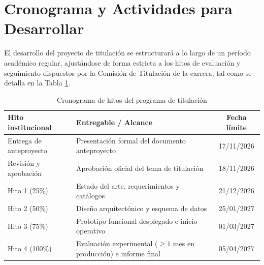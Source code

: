 \section{Cronograma y Actividades para Desarrollar}

El desarrollo del proyecto de titulación se estructurará a lo largo de un período académico regular, ajustándose de forma estricta a los hitos de evaluación y seguimiento dispuestos por la Comisión de Titulación de la carrera, tal como se detalla en la Tabla \ref{tab:cronograma}.

\begin{table}[H]
\centering
\caption{Cronograma de hitos del programa de titulación}
\label{tab:cronograma}
\begin{tabular}{p{5.0cm} p{7.0cm} c}
\toprule
\textbf{Hito institucional} & \textbf{Entregable / Alcance} & \textbf{Fecha límite} \\
\midrule
Entrega de anteproyecto & Presentación formal del documento anteproyecto & 17/11/2026 \\
Revisión y aprobación & Aprobación oficial del tema de titulación & 18/11/2026 \\
Hito 1 (25\%) & Estado del arte, requerimientos y catálogos & 21/12/2026 \\
Hito 2 (50\%) & Diseño arquitectónico y esquema de datos & 25/01/2027 \\
Hito 3 (75\%) & Prototipo funcional desplegado e inicio operativo & 01/03/2027 \\
Hito 4 (100\%) & Evaluación experimental ($\ge 1$ mes en producción) e informe final & 05/04/2027 \\
\bottomrule
\end{tabular}
\end{table}

